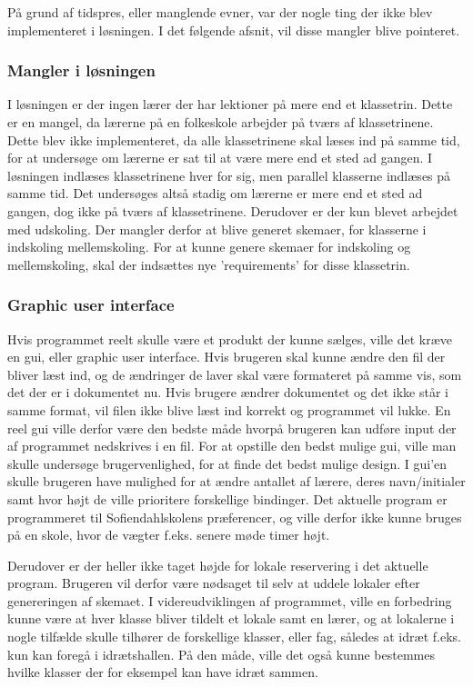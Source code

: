 På grund af tidspres, eller manglende evner, var der nogle ting der ikke blev implementeret i løsningen. I det følgende afsnit, vil disse mangler blive pointeret. 
\subsubsection{Mangler i løsningen}

I løsningen er der ingen lærer der har lektioner på mere end et klassetrin. Dette er en mangel, da lærerne på en folkeskole arbejder på tværs af klassetrinene. Dette blev ikke implementeret, da alle klassetrinene skal læses ind på samme tid, for at undersøge om lærerne er sat til at være mere end et sted ad gangen. I løsningen indlæses klassetrinene hver for sig, men parallel klasserne indlæses på samme tid. Det undersøges altså stadig om lærerne er mere end et sted ad gangen, dog ikke på tværs af klassetrinene. 
Derudover er der kun blevet arbejdet med udskoling. Der mangler derfor at blive generet skemaer, for klasserne i indskoling mellemskoling. For at kunne genere skemaer for indskoling og mellemskoling, skal der indsættes nye ’requirements’ for disse klassetrin.
\subsubsection{Graphic user interface}

Hvis programmet reelt skulle være et produkt der kunne sælges, ville det kræve en gui, eller graphic user interface. Hvis brugeren skal kunne ændre den fil der bliver læst ind, og de ændringer de laver skal være formateret på samme vis, som det der er i dokumentet nu. Hvis brugere ændrer dokumentet og det ikke står i samme format, vil filen ikke blive læst ind korrekt og programmet vil lukke. En reel gui ville derfor være den bedste måde hvorpå brugeren kan udføre input der af programmet nedskrives i en fil. For at opstille den bedst mulige gui, ville man skulle undersøge brugervenlighed, for at finde det bedst mulige design. I gui’en skulle brugeren have mulighed for at ændre antallet af lærere, deres navn/initialer samt hvor højt de ville prioritere forskellige bindinger. 
Det aktuelle program er programmeret til Sofiendahlskolens præferencer, og ville derfor ikke kunne bruges på en skole, hvor de vægter f.eks. senere møde timer højt. 


Derudover er der heller ikke taget højde for lokale reservering i det aktuelle program. Brugeren vil derfor være nødsaget til selv at uddele lokaler efter genereringen af skemaet. I videreudviklingen af programmet, ville en forbedring kunne være at hver klasse bliver tildelt et lokale samt en lærer, og at lokalerne i nogle tilfælde skulle tilhører de forskellige klasser, eller fag, således at idræt f.eks. kun kan foregå i idrætshallen. På den måde, ville det også kunne bestemmes hvilke klasser der for eksempel kan have idræt sammen. 


